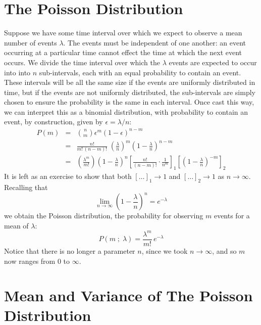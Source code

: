 \documentclass[12pt]{article}
\begin{document}
\section{The Poisson Distribution}

Suppose we have some time interval over which we expect to observe a mean number of events $\lambda$.  The events must be independent of one another:  an event occurring at a particular time cannot effect the time at which the next event occurs.  We divide the time interval over which the $\lambda$ events are expected to occur into into $n$ sub-intervals, each with an equal probability to contain an event.  These intervals will be all the same size if the events are uniformly distributed in time, but if the events are not uniformly distributed, the sub-intervals are simply chosen to ensure the probability is the same in each interval.  Once cast this way, we can interpret this as a binomial distribution, with probability to contain an event, by construction, given by $\epsilon = \lambda / n$:
\begin{eqnarray*}
P(m) &=& \binom{n}{m} \epsilon^m (1-\epsilon)^{n-m} \\[5pt]
  &=& \frac{n!}{m! \, (n-m)!} \; \left( \frac{\lambda}{n} \right)^m \left( 1 - \frac{\lambda}{n}\right)^{n-m} \\[5pt]
  &=& \left( \frac{\lambda^m}{m!} \right) \left(1-\frac{\lambda}{n} \right)^n \left[ \frac{n!}{(n-m)!} \cdot \frac{1}{n^m}\right]_1 \left[ \left( 1 - \frac{\lambda}{n}\right)^{-m}\right]_2
\end{eqnarray*}
It is left as an exercise to show that both $[\dots]_1 \to 1$ and $[\dots]_2 \to 1$ as $n \to \infty$.  Recalling that
\begin{displaymath}
\lim_{n \to \infty} \left(1 - \frac{\lambda}{n} \right)^n = e^{-\lambda}
\end{displaymath}
we obtain the Poisson distribution, the probability for observing $m$ events for a mean of $\lambda$:
\begin{equation}
\label{eqn:poisson}
P(m\; ; \; \lambda) = \frac{\lambda^m}{m!} \, e^{-\lambda}
\end{equation}
Notice that there is no longer a parameter $n$, since we took $n \to \infty$, and so $m$ now ranges from 0 to $\infty$.

\section{Mean and Variance of The Poisson Distribution}
\end{document}
